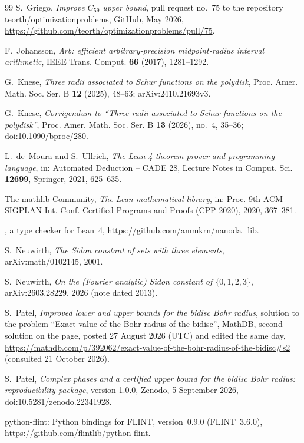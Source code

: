\documentclass[11pt]{amsart}
\theoremstyle{remark}
\numberwithin{equation}{section}
\newcommand{\lean}[1]{\texttt{\detokenize{#1}}}
\begin{document}
\begin{thebibliography}{99}
 S.~Griego, \emph{Improve $C_{59}$ upper bound}, pull request no.~75 to the repository teorth/optimizationproblems, GitHub, May 2026, \url{https://github.com/teorth/optimizationproblems/pull/75}.

 F.~Johansson, \emph{Arb: efficient arbitrary-precision midpoint-radius interval arithmetic}, IEEE Trans. Comput. \textbf{66} (2017), 1281--1292.

 G.~Knese, \emph{Three radii associated to Schur functions on the polydisk}, Proc. Amer. Math. Soc. Ser. B \textbf{12} (2025), 48--63; arXiv:2410.21693v3.

 G.~Knese, \emph{Corrigendum to ``Three radii associated to Schur functions on the polydisk''}, Proc. Amer. Math. Soc. Ser. B \textbf{13} (2026), no.~4, 35--36; doi:10.1090/bproc/280.

 L.~de~Moura and S.~Ullrich, \emph{The Lean 4 theorem prover and programming language}, in: Automated Deduction -- CADE 28, Lecture Notes in Comput. Sci. \textbf{12699}, Springer, 2021, 625--635.

 The mathlib Community, \emph{The Lean mathematical library}, in: Proc. 9th ACM SIGPLAN Int. Conf. Certified Programs and Proofs (CPP 2020), 2020, 367--381.

 \lean{nanoda_lib}, a type checker for Lean~4, \url{https://github.com/ammkrn/nanoda_lib}.

 S.~Neuwirth, \emph{The Sidon constant of sets with three elements}, arXiv:math/0102145, 2001.

 S.~Neuwirth, \emph{On the (Fourier analytic) Sidon constant of $\{0,1,2,3\}$}, arXiv:2603.28229, 2026 (note dated 2013).

 S.~Patel, \emph{Improved lower and upper bounds for the bidisc Bohr radius}, solution to the problem ``Exact value of the Bohr radius of the bidisc'', MathDB, second solution on the page, posted 27 August 2026 (UTC) and edited the same day, \url{https://mathdb.com/p/392062/exact-value-of-the-bohr-radius-of-the-bidisc#s2} (consulted 21 October 2026).

 S.~Patel, \emph{Complex phases and a certified upper bound for the bidisc Bohr radius: reproducibility package}, version 1.0.0, Zenodo, 5 September 2026, doi:10.5281/zenodo.22341928.

 python-flint: Python bindings for FLINT, version~0.9.0 (FLINT~3.6.0), \url{https://github.com/flintlib/python-flint}.


\end{thebibliography}
\end{document}
